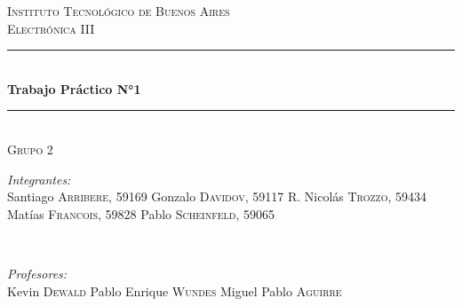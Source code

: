 \begin{titlepage}

\newcommand{\HRule}{\rule{\linewidth}{0.5mm}} %

\center %
 

\textsc{\LARGE  Instituto Tecnológico de Buenos Aires}\\[1.5cm] %
\textsc{\large Electrónica III}\\[0.5cm] %


\HRule \\[0.4cm]
{ \huge \bfseries Trabajo Práctico N°1}\\[0.4cm] %
\HRule \\[1.5cm]
 \textsc{\large Grupo 2}\\[0.5cm] 

\begin{minipage}{0.5\textwidth}
\begin{flushleft} \large
\emph{Integrantes:}\\
Santiago \textsc{Arribere, 59169} \newline %
Gonzalo \textsc{Davidov, 59117}\newline
R. Nicolás \textsc{Trozzo, 59434}\newline
Matías \textsc{Francois, 59828}\newline
Pablo \textsc{Scheinfeld, 59065}

\end{flushleft}
\end{minipage}
~
\begin{minipage}{0.4\textwidth}
\begin{flushright} \large
\emph{Profesores:} \\
Kevin \textsc{Dewald} %
Pablo Enrique \textsc{Wundes}
Miguel Pablo \textsc{Aguirre}
\end{flushright}
\end{minipage}\\[1cm]


\end{titlepage}
